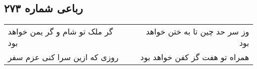 \begin{center}
\section*{رباعی شماره ۲۷۳}
\label{sec:sh273}
\begin{longtable}{l p{0.5cm} r}
گر ملک تو شام و گر یمن خواهد بود
&&
وز سر حد چین تا به ختن خواهد بود
\\
روزی که ازین سرا کنی عزم سفر
&&
همراه تو هفت گز کفن خواهد بود
\\
\end{longtable}
\end{center}
